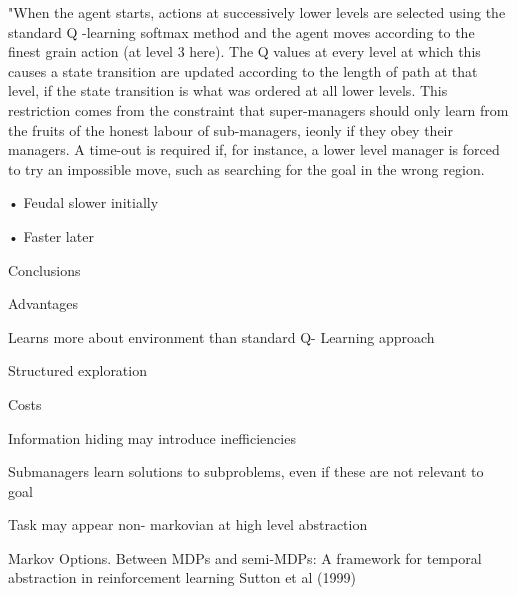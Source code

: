 \documentclass[english]{article}
\begin{document}
"When the agent starts, actions at successively lower levels are selected using the
standard Q -learning softmax method and the agent moves according to the finest
grain action (at level 3 here). The Q values at every level at which this causes
a state transition are updated according to the length of path at that level, if the
state transition is what was ordered at all lower levels. This restriction comes from
the constraint that super-managers should only learn from the fruits of the honest
labour of sub-managers, ieonly if they obey their managers. A time-out is required
if, for instance, a lower level manager is forced to try an impossible move, such as
searching for the goal in the wrong region.

•  Feudal slower initially

• Faster later

\item  
Conclusions

Advantages

\benum

\item  Learns more about
environment than standard Q-
Learning approach
\item  Structured exploration

\eenum

Costs

\benum

\item   Information hiding may
introduce inefficiencies
\item   Submanagers learn solutions
to subproblems, even if these
are not relevant to goal
\item   Task may appear non-
markovian at high level
abstraction
\eenum


\eenum

\item Markov Options. Between MDPs and semi-MDPs: A framework for temporal
abstraction in reinforcement learning Sutton et al (1999)
\end{document}
